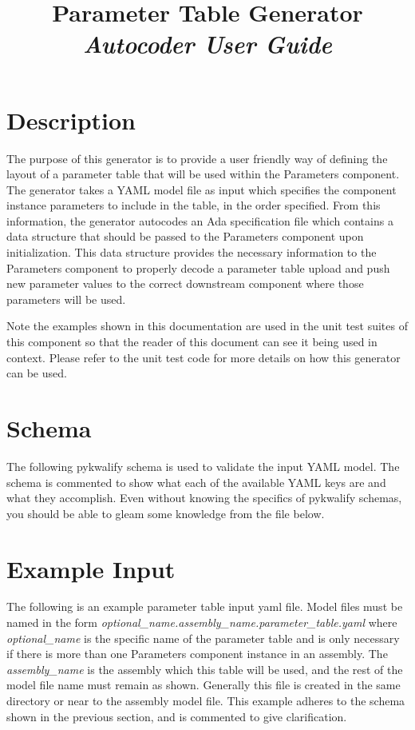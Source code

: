 



\title{\textbf{Parameter Table Generator} \\
\large\textit{Autocoder User Guide}}
\date{}
\maketitle

\section{Description}

The purpose of this generator is to provide a user friendly way of defining the layout of a parameter table that will be used within the Parameters component. The generator takes a YAML model file as input which specifies the component instance parameters to include in the table, in the order specified. From this information, the generator autocodes an Ada specification file which contains a data structure that should be passed to the Parameters component upon initialization. This data structure provides the necessary information to the Parameters component to properly decode a parameter table upload and push new parameter values to the correct downstream component where those parameters will be used.

Note the examples shown in this documentation are used in the unit test suites of this component so that the reader of this document can see it being used in context. Please refer to the unit test code for more details on how this generator can be used.

\section{Schema}

The following pykwalify schema is used to validate the input YAML model. The schema is commented to show what each of the available YAML keys are and what they accomplish. Even without knowing the specifics of pykwalify schemas, you should be able to gleam some knowledge from the file below.


\section{Example Input}

The following is an example parameter table input yaml file. Model files must be named in the form \textit{optional\_name.assembly\_name.parameter\_table.yaml} where \textit{optional\_name} is the specific name of the parameter table and is only necessary if there is more than one Parameters component instance in an assembly. The \textit{assembly\_name} is the assembly which this table will be used, and the rest of the model file name must remain as shown. Generally this file is created in the same directory or near to the assembly model file. This example adheres to the schema shown in the previous section, and is commented to give clarification.

